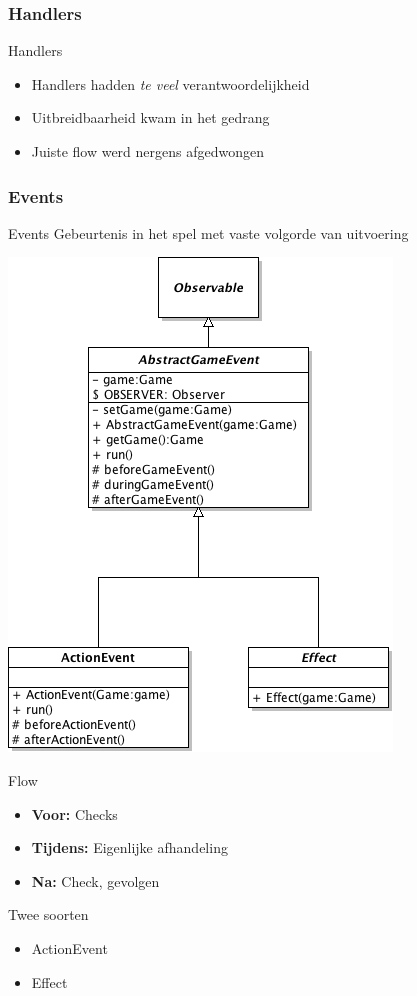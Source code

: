 \documentclass[t]{beamer}
\begin{document}
\subsubsection{Handlers}

\begin{frame}{Handlers}
\begin{center}
\end{center}
\begin{itemize}
	\item Handlers hadden \textit{te veel} verantwoordelijkheid
	\item Uitbreidbaarheid kwam in het gedrang
	\item Juiste flow werd nergens afgedwongen
\end{itemize}
\end{frame}

\subsubsection{Events}

\begin{frame}{Events}
Gebeurtenis in het spel met vaste volgorde van uitvoering

\begin{multicols}{2}
\begin{center}
\includegraphics[width=0.60\linewidth]{images/GameEvent}
\end{center}
Flow
\begin{itemize}
	\item \textbf{Voor:} Checks
	\item \textbf{Tijdens:} Eigenlijke afhandeling
	\item \textbf{Na:} Check, gevolgen
\end{itemize}
Twee soorten
\begin{itemize}
	\item ActionEvent
	\item Effect
\end{itemize}
\end{multicols}

\end{frame}
\end{document}
